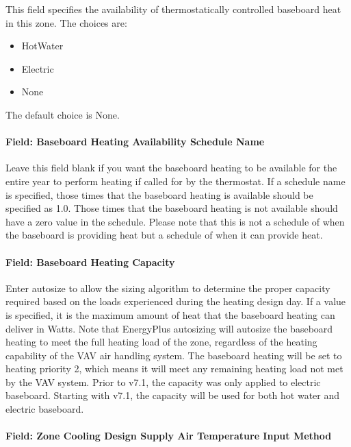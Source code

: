 This field specifies the availability of thermostatically controlled baseboard heat in this zone. The choices are:

\begin{itemize}
\item
  HotWater
\item
  Electric
\item
  None
\end{itemize}

The default choice is None.

\paragraph{Field: Baseboard Heating Availability Schedule Name}\label{field-baseboard-heating-availability-schedule-name-11}

Leave this field blank if you want the baseboard heating to be available for the entire year to perform heating if called for by the thermostat. If a schedule name is specified, those times that the baseboard heating is available should be specified as 1.0. Those times that the baseboard heating is not available should have a zero value in the schedule. Please note that this is not a schedule of when the baseboard is providing heat but a schedule of when it can provide heat.

\paragraph{Field: Baseboard Heating Capacity}\label{field-baseboard-heating-capacity-11}

Enter autosize to allow the sizing algorithm to determine the proper capacity required based on the loads experienced during the heating design day. If a value is specified, it is the maximum amount of heat that the baseboard heating can deliver in Watts. Note that EnergyPlus autosizing will autosize the baseboard heating to meet the full heating load of the zone, regardless of the heating capability of the VAV air handling system. The baseboard heating will be set to heating priority 2, which means it will meet any remaining heating load not met by the VAV system. Prior to v7.1, the capacity was only applied to electric baseboard. Starting with v7.1, the capacity will be used for both hot water and electric baseboard.

\paragraph{Field: Zone Cooling Design Supply Air Temperature Input Method}\label{field-zone-cooling-design-supply-air-temperature-input-method-10}

